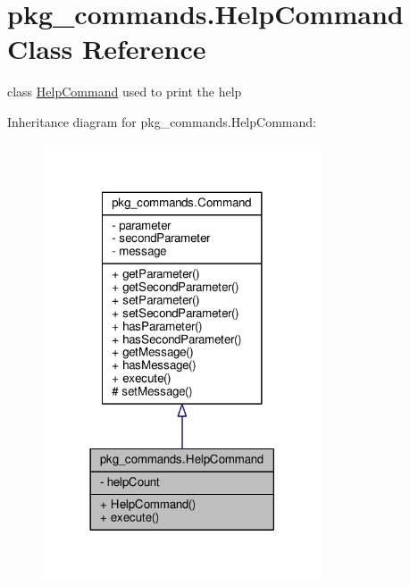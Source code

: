 \hypertarget{classpkg__commands_1_1HelpCommand}{\section{pkg\-\_\-commands.\-Help\-Command Class Reference}
\label{classpkg__commands_1_1HelpCommand}
}


class \hyperlink{classpkg__commands_1_1HelpCommand}{Help\-Command} used to print the help  




Inheritance diagram for pkg\-\_\-commands.\-Help\-Command\-:
\nopagebreak
\begin{figure}[H]
\begin{center}
\leavevmode
\includegraphics[width=234pt]{classpkg__commands_1_1HelpCommand__inherit__graph}
\end{center}
\end{figure}


